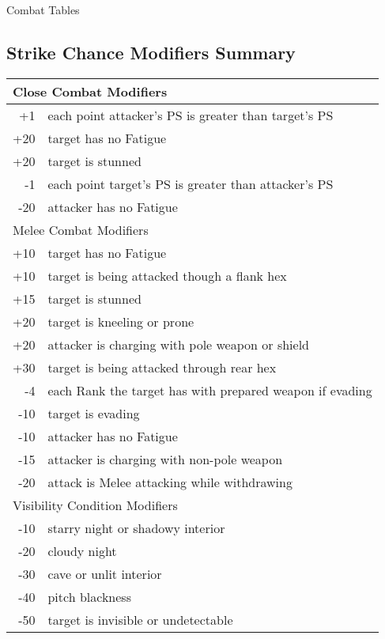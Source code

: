 \begin{Tables}{Combat Tables}

\begin{multicols}{3}

  
\section{Strike Chance Modifiers Summary}

\fontsize{9}{10pt}\selectfont

\begin{tabularx}{\columnwidth}{rX} \hline
\multicolumn{2}{l}{Close Combat Modifiers} \\ \hline
+1 	& each point attacker’s PS is greater than target’s PS \\
+20	& target has no Fatigue \\
+20	& target is stunned \\
-1	& each point target’s PS is greater than attacker’s PS \\
-20	& attacker has no Fatigue \\ \hline
\multicolumn{2}{l}{Melee Combat Modifiers} \\ \hline
+10	& target has no Fatigue \\
+10	& target is being attacked though a flank hex \\
+15	& target is stunned \\
+20	& target is kneeling or prone \\
+20	& attacker is charging with pole weapon or shield \\
+30	& target is being attacked through rear hex \\
-4	& each Rank the target has with prepared weapon if evading \\
-10	& target is evading \\
-10	& attacker has no Fatigue \\
-15	& attacker is charging with non-pole weapon \\
-20	& attack is Melee attacking while withdrawing \\ \hline
\multicolumn{2}{l}{Visibility Condition Modifiers} \\ \hline
-10	& starry night or shadowy interior \\
-20	& cloudy night \\
-30	& cave or unlit interior \\
-40	& pitch blackness \\
-50	& target is invisible or undetectable \\ \hline

\end{tabularx}
\end{multicols}
\end{Tables}
